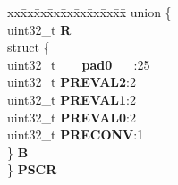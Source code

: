 \begin{DoxyCompactItemize}
\begin{tabbing}
\end{tabbing}\item 
\mbox{\label{structADC__tag_a0b8d039637e53f2153c0130dcbaa3cf6}} 
\begin{tabbing}
xx\=xx\=xx\=xx\=xx\=xx\=xx\=xx\=xx\=\kill
union \{\\
\>uint32\_t {\bfseries R}\\
\>struct \{\\
\>\>uint32\_t {\bfseries \_\_pad0\_\_}:25\\
\>\>uint32\_t {\bfseries PREVAL2}:2\\
\>\>uint32\_t {\bfseries PREVAL1}:2\\
\>\>uint32\_t {\bfseries PREVAL0}:2\\
\>\>uint32\_t {\bfseries PRECONV}:1\\
\>\} {\bfseries B}\\
\} {\bfseries PSCR}\\


\end{tabbing}
\end{DoxyCompactItemize}
